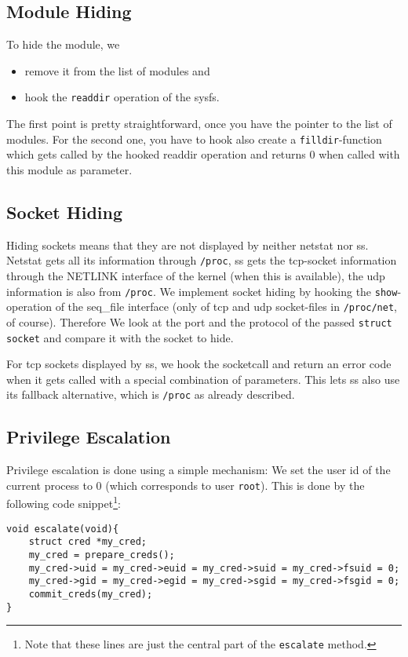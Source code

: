 \documentclass[10pt, letterpaper]{article}
\begin{document}
\subsection{Module Hiding}
To hide the module, we 
\begin{itemize}
 \item remove it from the list of modules and
 \item hook the \texttt{readdir} operation of the sysfs.
\end{itemize}

The first point is pretty straightforward, once you have the pointer to the list of modules.
For the second one, you have to hook also create a \texttt{filldir}-function which gets called by the hooked readdir operation and returns 0 when called with this module as parameter.

\subsection{Socket Hiding}
Hiding sockets means that they are not displayed by neither netstat nor ss.
Netstat gets all its information through \texttt{/proc}, ss gets the tcp-socket information through the NETLINK interface of the kernel (when this is available), the udp information is also from \texttt{/proc}.
We implement socket hiding by hooking the \texttt{show}-operation of the seq\_file interface (only of tcp and udp socket-files in \texttt{/proc/net}, of course). Therefore We look at the port and the protocol of the passed \texttt{struct socket} and compare it with the socket to hide.

For tcp sockets displayed by ss, we hook the socketcall and return an error code when it gets called with a special combination of parameters. This lets ss also use its fallback alternative, which is \texttt{/proc} as already described.
\subsection{Privilege Escalation}

Privilege escalation is done using a simple mechanism: We set the user id of the current process to 0 (which corresponds to user \texttt{root}). This is done by the following code snippet\footnote{Note that these lines are just the central part of the \texttt{escalate} method.}:

\begin{verbatim}
void escalate(void){
    struct cred *my_cred;
    my_cred = prepare_creds(); 
    my_cred->uid = my_cred->euid = my_cred->suid = my_cred->fsuid = 0;
    my_cred->gid = my_cred->egid = my_cred->sgid = my_cred->fsgid = 0;
    commit_creds(my_cred);
}
\end{verbatim}
\end{document}

